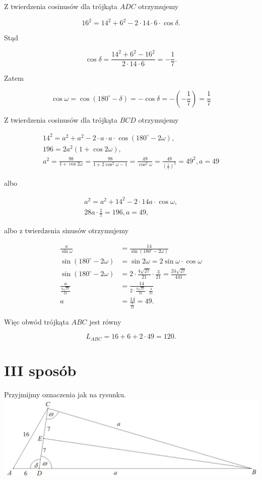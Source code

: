\documentclass[10pt]{article}
\begin{document}
Z twierdzenia cosinusów dla trójkąta $A D C$ otrzymujemy

$$
16^{2}=14^{2}+6^{2}-2 \cdot 14 \cdot 6 \cdot \cos \delta .
$$

Stąd

$$
\cos \delta=\frac{14^{2}+6^{2}-16^{2}}{2 \cdot 14 \cdot 6}=-\frac{1}{7} .
$$

Zatem

$$
\cos \omega=\cos \left(180^{\circ}-\delta\right)=-\cos \delta=-\left(-\frac{1}{7}\right)=\frac{1}{7}
$$

Z twierdzenia cosinusów dla trójkąta $B C D$ otrzymujemy

$$
\begin{gathered}
14^{2}=a^{2}+a^{2}-2 \cdot a \cdot a \cdot \cos \left(180^{\circ}-2 \omega\right), \\
196=2 a^{2}(1+\cos 2 \omega), \\
a^{2}=\frac{98}{1+\cos 2 \omega}=\frac{98}{1+2 \cos ^{2} \omega-1}=\frac{49}{\cos ^{2} \omega}=\frac{49}{\left(\frac{1}{7}\right)^{2}}=49^{2}, a=49
\end{gathered}
$$

albo

$$
\begin{gathered}
a^{2}=a^{2}+14^{2}-2 \cdot 14 a \cdot \cos \omega, \\
28 a \cdot \frac{1}{7}=196, a=49,
\end{gathered}
$$

albo z twierdzenia sinusów otrzymujemy

$$
\begin{aligned}
\frac{a}{\sin \omega} & =\frac{14}{\sin \left(180^{\circ}-2 \omega\right)} \\
\sin \left(180^{\circ}-2 \omega\right) & =\sin 2 \omega=2 \sin \omega \cdot \cos \omega \\
\sin \left(180^{\circ}-2 \omega\right) & =2 \cdot \frac{4 \sqrt{27}}{21} \cdot \frac{3}{21}=\frac{24 \sqrt{27}}{441} \\
\frac{a}{\frac{4 \sqrt{27}}{21}} & =\frac{14}{2 \cdot \frac{4 \sqrt{27}}{21} \cdot \frac{3}{21}} \\
a & =\frac{14}{\frac{6}{21}}=49 .
\end{aligned}
$$

Więc obwód trójkąta $A B C$ jest równy

$$
L_{A B C}=16+6+2 \cdot 49=120 .
$$

\section*{III sposób}
Przyjmijmy oznaczenia jak na rysunku.\\
\includegraphics[max width=\textwidth, center]{2025_02_07_d712b9a47aa2c64928dbg-26(1)}
\end{document}
